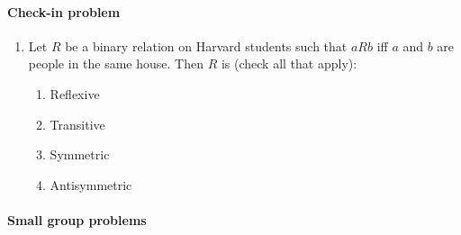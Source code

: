 \documentclass[12pt]{article}
\begin{document}
\paragraph*{Check-in problem}
\begin{enumerate}
\item Let $R$ be a binary relation on Harvard students such that $aRb$ iff $a$ and $b$ are people in the same house. Then $R$ is (check all that apply):
\begin{enumerate}
\item Reflexive
\item Transitive
\item Symmetric
\item Antisymmetric
\end{enumerate}
\end{enumerate}

\paragraph*{Small group problems}
\end{document}
